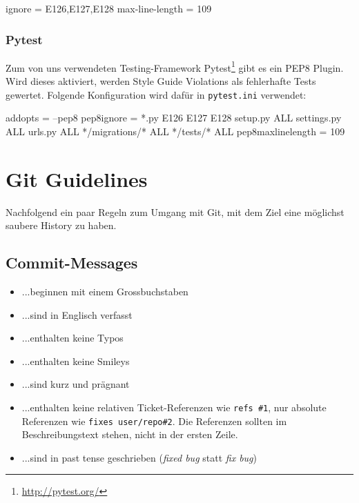 \begin{inicode}
[flake8]
ignore = E126,E127,E128
max-line-length = 109
\end{inicode}

\subsubsection{Pytest}

Zum von uns verwendeten Testing-Framework
Pytest\footnote{\url{http://pytest.org/}} gibt es ein PEP8 Plugin. Wird dieses
aktiviert, werden Style Guide Violations als fehlerhafte Tests gewertet.
Folgende Konfiguration wird dafür in \texttt{pytest.ini} verwendet:

\begin{inicode}
[pytest]
addopts = --pep8
pep8ignore =
    *.py E126 E127 E128
    setup.py ALL
    settings.py ALL
    urls.py ALL
    */migrations/* ALL
    */tests/* ALL
pep8maxlinelength = 109
\end{inicode}


\section{Git Guidelines}
\label{ref:git-guidelines}

Nachfolgend ein paar Regeln zum Umgang mit Git, mit dem Ziel eine möglichst
saubere History zu haben.

\subsection{Commit-Messages}

\begin{itemize}
	\item ...beginnen mit einem Grossbuchstaben
	\item ...sind in Englisch verfasst
	\item ...enthalten keine Typos
	\item ...enthalten keine Smileys
	\item ...sind kurz und prägnant
	\item ...enthalten keine relativen Ticket-Referenzen wie \texttt{refs \#1},
		nur absolute Referenzen wie \texttt{fixes user/repo\#2}. Die
		Referenzen sollten im Beschreibungstext stehen, nicht in der ersten Zeile.
	\item ...sind in past tense geschrieben (\textit{fixed bug} statt \textit{fix
		bug})
\end{itemize}


